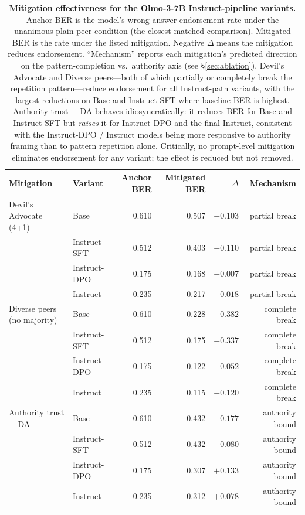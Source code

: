 \documentclass[11pt]{article}
\begin{document}
\begin{table}[H]
    \centering
    \footnotesize
    \setlength{\tabcolsep}{4pt}
    \renewcommand{\arraystretch}{1.0}
    \begin{tabular}{l l r r r r}
        \toprule
        Mitigation & Variant & Anchor BER & Mitigated BER & $\Delta$ & Mechanism \\
        \midrule
        Devil's Advocate (4+1) & Base & 0.610 & 0.507 & $-0.103$ & partial break \\
         & Instruct-SFT & 0.512 & 0.403 & $-0.110$ & partial break \\
         & Instruct-DPO & 0.175 & 0.168 & $-0.007$ & partial break \\
         & Instruct & 0.235 & 0.217 & $-0.018$ & partial break \\
        \midrule
        Diverse peers (no majority) & Base & 0.610 & 0.228 & $-0.382$ & complete break \\
         & Instruct-SFT & 0.512 & 0.175 & $-0.337$ & complete break \\
         & Instruct-DPO & 0.175 & 0.122 & $-0.052$ & complete break \\
         & Instruct & 0.235 & 0.115 & $-0.120$ & complete break \\
        \midrule
        Authority trust + DA & Base & 0.610 & 0.432 & $-0.177$ & authority bound \\
         & Instruct-SFT & 0.512 & 0.432 & $-0.080$ & authority bound \\
         & Instruct-DPO & 0.175 & 0.307 & $+0.133$ & authority bound \\
         & Instruct & 0.235 & 0.312 & $+0.078$ & authority bound \\
        \bottomrule
    \end{tabular}
    \caption{\textbf{Mitigation effectiveness for the Olmo-3-7B Instruct-pipeline variants.} Anchor BER is the model's wrong-answer endorsement rate under the unanimous-plain peer condition (the closest matched comparison). Mitigated BER is the rate under the listed mitigation. Negative $\Delta$ means the mitigation reduces endorsement. ``Mechanism'' reports each mitigation's predicted direction on the pattern-completion vs.\ authority axis (see \S\ref{sec:ablation}). Devil's Advocate and Diverse peers---both of which partially or completely break the repetition pattern---reduce endorsement for all Instruct-path variants, with the largest reductions on Base and Instruct-SFT where baseline BER is highest. Authority-trust + DA behaves idiosyncratically: it reduces BER for Base and Instruct-SFT but \emph{raises} it for Instruct-DPO and the final Instruct, consistent with the Instruct-DPO / Instruct models being more responsive to authority framing than to pattern repetition alone. Critically, no prompt-level mitigation eliminates endorsement for any variant; the effect is reduced but not removed.}
    \label{tab:mitigation_effectiveness}
\end{table}
\end{document}

